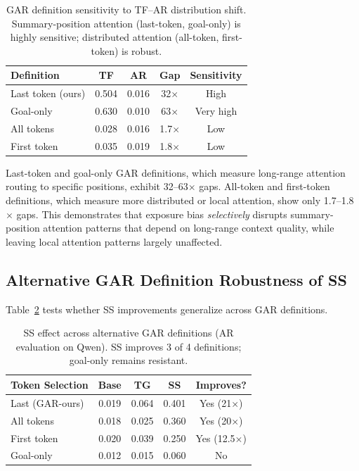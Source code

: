 \documentclass[11pt,a4paper]{article}
\begin{document}
\begin{table}[t]
\centering
\small
\caption{GAR definition sensitivity to TF--AR distribution shift. Summary-position attention (last-token, goal-only) is highly sensitive; distributed attention (all-token, first-token) is robust.}
\label{tab:gar_defs}
\begin{tabular}{@{}lcccc@{}}
\toprule
Definition & TF & AR & Gap & Sensitivity \\
\midrule
Last token (ours) & 0.504 & 0.016 & 32$\times$ & High \\
Goal-only & 0.630 & 0.010 & 63$\times$ & Very high \\
All tokens & 0.028 & 0.016 & 1.7$\times$ & Low \\
First token & 0.035 & 0.019 & 1.8$\times$ & Low \\
\bottomrule
\end{tabular}
\end{table}

Last-token and goal-only GAR definitions, which measure long-range attention routing to specific positions, exhibit 32--63$\times$ gaps. All-token and first-token definitions, which measure more distributed or local attention, show only 1.7--1.8$\times$ gaps. This demonstrates that exposure bias \emph{selectively} disrupts summary-position attention patterns that depend on long-range context quality, while leaving local attention patterns largely unaffected.

\subsection{Alternative GAR Definition Robustness of SS}

Table~\ref{tab:gar_alt} tests whether SS improvements generalize across GAR definitions.

\begin{table}[t]
\centering
\small
\caption{SS effect across alternative GAR definitions (AR evaluation on Qwen). SS improves 3 of 4 definitions; goal-only remains resistant.}
\label{tab:gar_alt}
\begin{tabular}{@{}lcccc@{}}
\toprule
Token Selection & Base & TG & SS & Improves? \\
\midrule
Last (GAR-ours) & 0.019 & 0.064 & 0.401 & Yes (21$\times$) \\
All tokens & 0.018 & 0.025 & 0.360 & Yes (20$\times$) \\
First token & 0.020 & 0.039 & 0.250 & Yes (12.5$\times$) \\
Goal-only & 0.012 & 0.015 & 0.060 & No \\
\bottomrule
\end{tabular}
\end{table}
\end{document}
